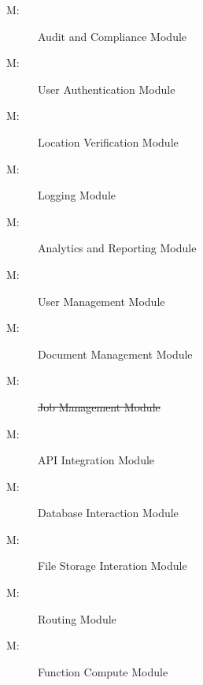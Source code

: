 \documentclass[12pt, titlepage]{article}
\newcounter{mnum}
\newcommand{\mthemnum}{M\themnum}
\begin{document}
\begin{description}
  \item [ \mthemnum \label{mAC}:] Audit and
    Compliance Module
  \item [ \mthemnum \label{mUA}:] User
    Authentication Module
  \item [ \mthemnum \label{mLV}:] Location Verification
    Module
  \item [ \mthemnum \label{mLM}:] Logging Module
  \item [ \mthemnum \label{mAR}:] Analytics and Reporting
    Module
  \item [ \mthemnum \label{mUM}:] User Management Module
  \item [ \mthemnum \label{mDM}:] Document
    Management Module
  \item [ \mthemnum \label{mJM}:] \sout{Job Management Module}
  \item [ \mthemnum \label{mAI}:] API Integration Module
  \item [ \mthemnum \label{mDI}:] Database
    Interaction Module
  \item [ \mthemnum \label{mBS}:] File Storage Interation
    Module
  \item [ \mthemnum \label{mRR}:] Routing Module
  \item [ \mthemnum \label{mFC}:] Function Compute Module
\end{description}
\end{document}
